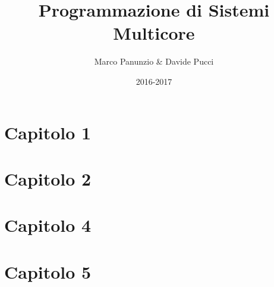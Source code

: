 

\title{Programmazione di Sistemi Multicore}
\author{Marco Panunzio \& Davide Pucci}
\date{2016-2017}


	
\maketitle
	
\tableofcontents

\chapter{Capitolo 1}


\chapter{Capitolo 2}


\chapter{Capitolo 4}


\chapter{Capitolo 5}


